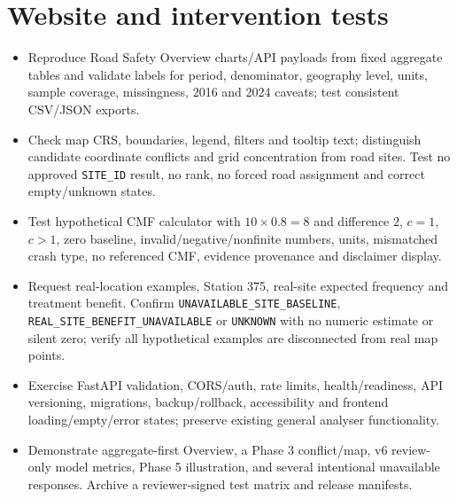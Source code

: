 \documentclass[11pt,a4paper,openany]{report}
\newcommand{\pathcode}[1]{\nolinkurl{#1}}
\begin{document}
\section{Website and intervention tests}
\begin{itemize}
\item Reproduce Road Safety Overview charts/API payloads from fixed aggregate tables and validate labels for period, denominator, geography level, units, sample coverage, missingness, 2016 and 2024 caveats; test consistent CSV/JSON exports.
\item Check map CRS, boundaries, legend, filters and tooltip text; distinguish candidate coordinate conflicts and grid concentration from road sites. Test no approved \pathcode{SITE_ID} result, no rank, no forced road assignment and correct empty/unknown states.
\item Test hypothetical CMF calculator with \(10\times 0.8=8\) and difference \(2\), \(c=1\), \(c>1\), zero baseline, invalid/negative/nonfinite numbers, units, mismatched crash type, no referenced CMF, evidence provenance and disclaimer display.
\item Request real-location examples, Station 375, real-site expected frequency and treatment benefit. Confirm \pathcode{UNAVAILABLE_SITE_BASELINE}, \pathcode{REAL_SITE_BENEFIT_UNAVAILABLE} or \pathcode{UNKNOWN} with no numeric estimate or silent zero; verify all hypothetical examples are disconnected from real map points.
\item Exercise FastAPI validation, CORS/auth, rate limits, health/readiness, API versioning, migrations, backup/rollback, accessibility and frontend loading/empty/error states; preserve existing general analyser functionality.
\item Demonstrate aggregate-first Overview, a Phase 3 conflict/map, v6 review-only model metrics, Phase 5 illustration, and several intentional unavailable responses. Archive a reviewer-signed test matrix and release manifests.
\end{itemize}
\end{document}
